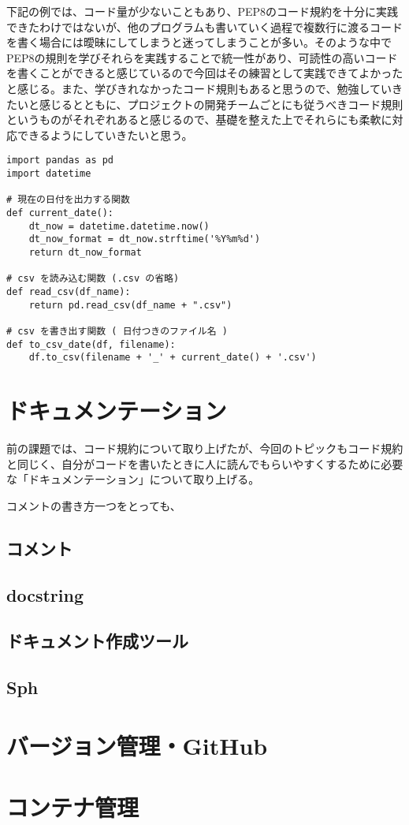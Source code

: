 \documentclass[12pt]{jsarticle}
\begin{document}
下記の例では、コード量が少ないこともあり、PEP8のコード規約を十分に実践できたわけではないが、他のプログラムも書いていく過程で複数行に渡るコードを書く場合には曖昧にしてしまうと迷ってしまうことが多い。そのような中でPEP8の規則を学びそれらを実践することで統一性があり、可読性の高いコードを書くことができると感じているので今回はその練習として実践できてよかったと感じる。また、学びきれなかったコード規則もあると思うので、勉強していきたいと感じるとともに、プロジェクトの開発チームごとにも従うべきコード規則というものがそれぞれあると感じるので、基礎を整えた上でそれらにも柔軟に対応できるようにしていきたいと思う。

\begin{lstlisting}[caption=tips.py]
import pandas as pd
import datetime

# 現在の日付を出力する関数
def current_date():
    dt_now = datetime.datetime.now()
    dt_now_format = dt_now.strftime('%Y%m%d')
    return dt_now_format

# csv を読み込む関数 (.csv の省略)
def read_csv(df_name):
    return pd.read_csv(df_name + ".csv")

# csv を書き出す関数 ( 日付つきのファイル名 )
def to_csv_date(df, filename):
    df.to_csv(filename + '_' + current_date() + '.csv')

\end{lstlisting}

\newpage
\section{ドキュメンテーション}
前の課題では、コード規約について取り上げたが、今回のトピックもコード規約と同じく、自分がコードを書いたときに人に読んでもらいやすくするために必要な「ドキュメンテーション」について取り上げる。

コメントの書き方一つをとっても、

\subsection{コメント}

\subsection{docstring}

\subsection{ドキュメント作成ツール}

\subsection{Sph}


\newpage
\section{バージョン管理・GitHub}



\newpage
\section{コンテナ管理}
\end{document}
